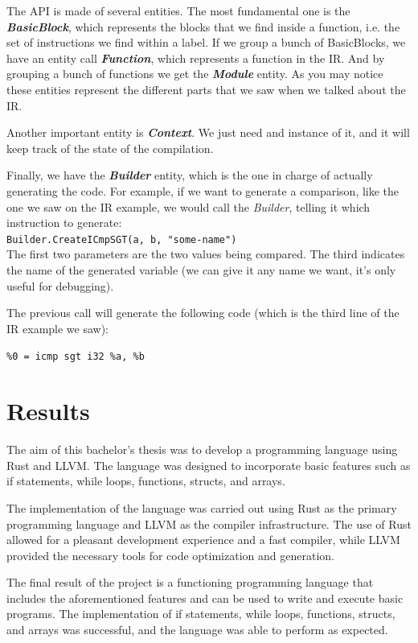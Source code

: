 ﻿\documentclass[10pt,a4paper,twocolumn,twoside]{article}
\begin{document}
The API is made of several entities. The most fundamental one is the
\textbf{\textit{BasicBlock}}, which represents the blocks that we find inside a
function, i.e. the set of instructions we find within a label. If we group a
bunch of BasicBlocks, we have an entity call \textbf{\textit{Function}}, which
represents a function in the IR. And by grouping a bunch of functions we get the
\textbf{\textit{Module}} entity. As you may notice these entities represent the
different parts that we saw when we talked about the IR.

Another important entity is \textit{\textbf{Context}}. We just need and instance of it, 
and it will keep track of the state of the compilation.

Finally, we have the \textit{\textbf{Builder}} entity, which is the one in charge of 
actually generating the code. For example, if we want to generate a comparison,
like the one we saw on the IR example, we would call the \textit{Builder}, 
telling it which instruction to generate:\\

\texttt{Builder.CreateICmpSGT(a, b, "some-name")}
\\

The first two parameters are the two values being compared. The third 
indicates the name of the generated variable (we can give it any name we want,
it's only useful for debugging).

The previous call will generate the following code (which is the third line of
the IR example we saw):

\texttt{\%0 = icmp sgt i32 \%a, \%b}

\section{Results}
The aim of this bachelor's thesis was to develop a programming language using
Rust and LLVM. The language was designed to incorporate basic features such as
if statements, while loops, functions, structs, and arrays.

The implementation of the language was carried out using Rust as the primary
programming language and LLVM as the compiler infrastructure. The use of Rust
allowed for a pleasant development experience and a fast compiler, while LLVM 
provided the necessary tools for code optimization and generation.

The final result of the project is a functioning programming language that
includes the aforementioned features and can be used to write and execute basic
programs. The implementation of if statements, while loops, functions, structs,
and arrays was successful, and the language was able to perform as expected.
\end{document}
